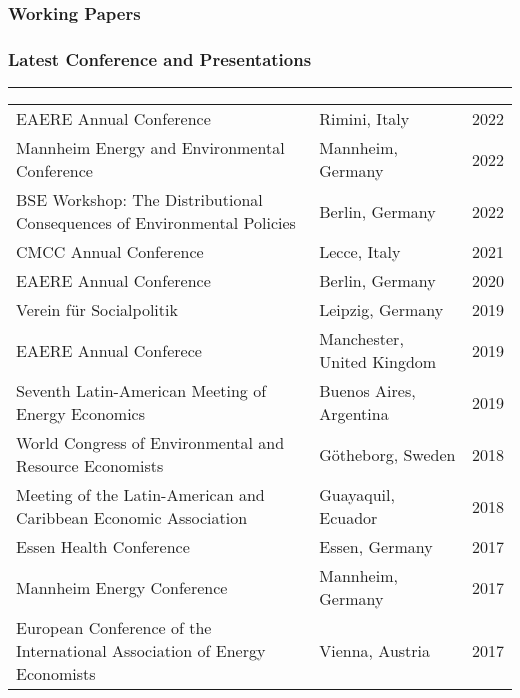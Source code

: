 \documentclass[
  0.8em,
  letterpaper,
  DIV=11,
  numbers=noendperiod]{scrartcl}
\begin{document}
\hypertarget{fa-person-digging-working-papers}{%
\subsubsection{\texorpdfstring{ Working
Papers}{ Working Papers}}\label{fa-person-digging-working-papers}}

\hypertarget{fa-person-chalkboard-latest-conference-and-presentations}{%
\subsubsection{\texorpdfstring{ Latest
Conference and
Presentations}{ Latest Conference and Presentations}}\label{fa-person-chalkboard-latest-conference-and-presentations}}

\begin{center}\rule{0.5\linewidth}{0.5pt}\end{center}

\begin{longtable}[]{@{}llc@{}}
\toprule()
\endhead
EAERE Annual Conference & Rimini, Italy & 2022 \\
Mannheim Energy and Environmental Conference & Mannheim, Germany &
2022 \\
BSE Workshop: The Distributional Consequences of Environmental Policies
& Berlin, Germany & 2022 \\
CMCC Annual Conference & Lecce, Italy & 2021 \\
EAERE Annual Conference & Berlin, Germany & 2020 \\
Verein für Socialpolitik & Leipzig, Germany & 2019 \\
EAERE Annual Conferece & Manchester, United Kingdom & 2019 \\
Seventh Latin-American Meeting of Energy Economics & Buenos Aires,
Argentina & 2019 \\
World Congress of Environmental and Resource Economists & Götheborg,
Sweden & 2018 \\
Meeting of the Latin-American and Caribbean Economic Association &
Guayaquil, Ecuador & 2018 \\
Essen Health Conference & Essen, Germany & 2017 \\
Mannheim Energy Conference & Mannheim, Germany & 2017 \\
European Conference of the International Association of Energy
Economists & Vienna, Austria & 2017 \\
\bottomrule()
\end{longtable}
\end{document}
